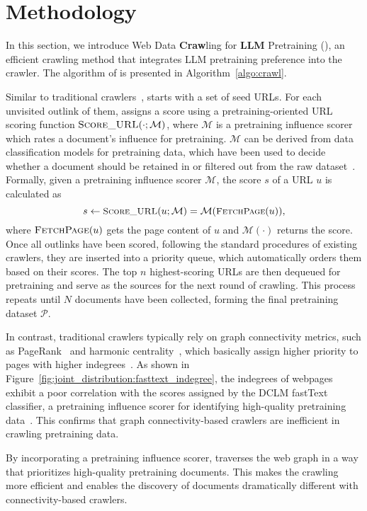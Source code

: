 \section{Methodology}



In this section, we introduce Web Data \textbf{Craw}ling for \textbf{LL}\textbf{M} Pretraining (\ours{}), an efficient crawling method that integrates LLM pretraining preference into the crawler.
The algorithm of \ours{} is presented in Algorithm~\ref{algo:crawl}.



Similar to traditional crawlers~\citep{pr-crawl}, \ours{} starts with a set of seed URLs.
For each unvisited outlink of them, \ours{} assigns a score using a pretraining-oriented URL scoring function $\textsc{Score\_URL}(\cdot;\mathcal{M})$, where $\mathcal{M}$ is a pretraining influence scorer which rates a document's influence for pretraining.
$\mathcal{M}$ can be derived from data classification models for pretraining data, which have been used to decide whether a document should be retained in or filtered out from the raw dataset~\citep{dclm,fineweb}.
Formally, given a pretraining influence scorer $\mathcal{M}$, the score $s$ of a URL $u$ is calculated as
\begin{equation}
\label{eq:score}
\small
    s \gets \textsc{Score\_URL}(u;\mathcal{M}) = \mathcal{M}(\textsc{FetchPage}(u)),
\end{equation}
where $\textsc{FetchPage}(u)$ gets the page content of $u$ and $\mathcal{M}(\cdot)$ returns the score.
Once all outlinks have been scored, following the standard procedures of existing crawlers, they are inserted into a priority queue, which automatically orders them based on their scores.
The top $n$ highest-scoring URLs are then dequeued for pretraining and serve as the sources for the next round of crawling.
This process repeats until $N$ documents have been collected, forming the final pretraining dataset $\mathcal{P}$.

In contrast, traditional crawlers typically rely on graph connectivity metrics, such as PageRank~\citep{pr-crawl} and harmonic centrality~\citep{cc-analysis}, which basically assign higher priority to pages with higher indegrees~\citep{pr-and-indegree}.
As shown in Figure~\ref{fig:joint_distribution:fasttext_indegree}, the indegrees of webpages exhibit a poor correlation with the scores assigned by the DCLM fastText classifier, a pretraining influence scorer for identifying high-quality pretraining data~\citep{dclm}.
This confirms that graph connectivity-based crawlers are inefficient in crawling pretraining data. 



By incorporating a pretraining influence scorer, \ours{} traverses the web graph in a way that prioritizes high-quality pretraining documents.  
This makes the crawling more efficient and enables the discovery of documents dramatically different with connectivity-based crawlers.


